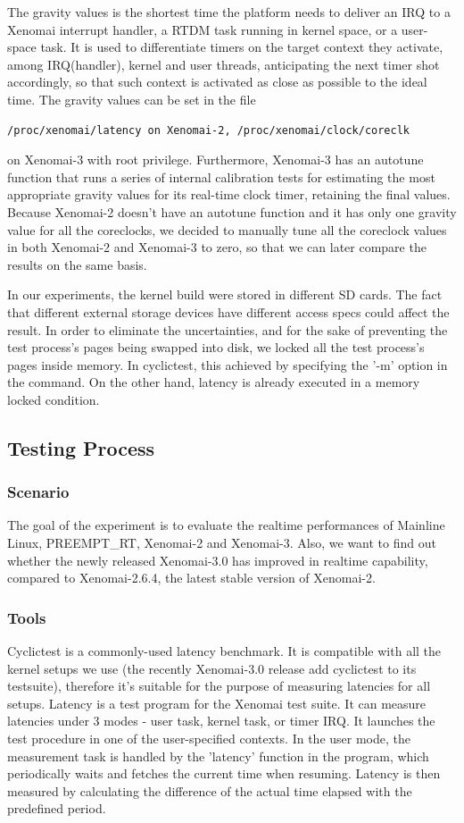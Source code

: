 \documentclass[10pt,a4paper]{article}
\begin{document}
\begin{multicols}{2}
  The gravity values is the shortest time the platform needs to deliver an IRQ to a Xenomai interrupt handler,  a RTDM task running in kernel space, or a user-space task. It is used to differentiate timers on the target context they activate, among IRQ(handler), kernel and user threads, anticipating the next timer shot accordingly, so that such context is activated as close as possible to the ideal time. The gravity values can be set in the file \begin{verbatim}/proc/xenomai/latency on Xenomai-2, /proc/xenomai/clock/coreclk
\end{verbatim} on Xenomai-3 with root privilege. Furthermore, Xenomai-3 has an autotune function that runs a series of internal calibration tests for estimating the most appropriate gravity values for its real-time clock timer, retaining the final values.
Because Xenomai-2 doesn't have an autotune function and it has only one gravity value for all the 
coreclocks, we decided to manually tune all the coreclock values in both Xenomai-2 and Xenomai-3 to zero, so that we can later compare the results on the same basis. 

In our experiments, the kernel build were stored in different SD cards. The fact that different external storage devices have different access specs could affect the result. In order to eliminate the uncertainties, and for the sake of preventing the test process's pages being swapped into disk, we locked all the test process's pages inside memory. In cyclictest, this achieved by specifying the '-m' option in the command. On the other hand, latency is already executed in a memory locked condition.

\subsection{Testing Process}

\subsubsection{Scenario}
The goal of the experiment is to evaluate the realtime performances of Mainline Linux, PREEMPT\_RT, 
Xenomai-2 and Xenomai-3. Also, we want to find out whether the newly released Xenomai-3.0 has improved in realtime capability, compared to Xenomai-2.6.4, the latest stable version of Xenomai-2.
\subsubsection{Tools}
Cyclictest is a commonly-used latency benchmark. It is compatible with all the kernel setups we use (the recently Xenomai-3.0 release add cyclictest to its testsuite), therefore it's suitable for the purpose of measuring latencies for all setups.
Latency is a test program for the Xenomai test suite. It can measure latencies under 3 modes - user task, kernel task, or timer IRQ. It launches the test procedure in one of the user-specified contexts. In the user mode, the measurement task is handled by the 'latency' function in the program, which periodically waits and fetches the current time when resuming. Latency is then measured by calculating the difference of the actual time elapsed with the predefined period.

\end{multicols}
\end{document}
